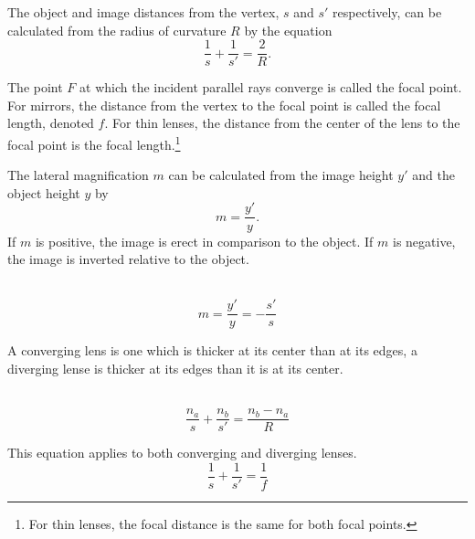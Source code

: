 \documentclass[nobib,notoc]{tufte-handout}
\begin{document}
\begin{defi}
	The object and image distances from the vertex, \(s\) and \(s'\) respectively, can be calculated from the radius of curvature \(R\) by the equation
	\begin{equation*}
		\frac{1}{s}+\frac{1}{s'}=\frac{2}{R}.
	\end{equation*}
\end{defi}
\begin{defi}
	The point \(F\) at which the incident parallel rays converge is called the focal point. For mirrors, the distance from the vertex to the focal point is called the focal length, denoted \(f\). For thin lenses, the distance from the center of the lens to the focal point is the focal length.\footnote{For thin lenses, the focal distance is the same for both focal points.}
\end{defi}
\begin{defi}
	The lateral magnification \(m\) can be calculated from the image height \(y'\) and the object height \(y\) by
	\begin{equation*}
	m=\frac{y'}{y}.
	\end{equation*}
	If \(m\) is positive, the image is erect in comparison to the object. If \(m\) is negative, the image is inverted relative to the object.
\end{defi}
\begin{defi}
	\,
	\begin{equation*}
		m=\frac{y'}{y}=-\frac{s'}{s}
	\end{equation*}
\end{defi}
\begin{defi}
	A converging lens is one which is thicker at its center than at its edges, a diverging lense is thicker at its edges than it is at its center.
\end{defi}
\begin{defi}
	\,
	\begin{equation*}
		\frac{n_a}{s}+\frac{n_b}{s'}=\frac{n_b-n_a}{R}
	\end{equation*}
\end{defi}
\begin{defi}
	This equation applies to both converging and diverging lenses.
	\begin{equation*}
		\frac{1}{s}+\frac{1}{s'}=\frac{1}{f}
	\end{equation*}
\end{defi}
\end{document}
